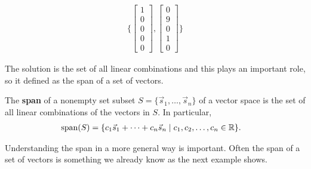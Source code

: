 \begin{align*} \{
\begin{bmatrix}
1 \\ 0 \\ 0 \\ 0 \\0
\end{bmatrix},
\begin{bmatrix}
0 \\ 9 \\ 0 \\ 1 \\ 0
\end{bmatrix}  \}
\end{align*}

The solution is the set of all linear combinations and this plays an important role, so it defined as the span of a set of vectors.



\begin{definition}
The \textbf{span} of a nonempty set subset $S=\{\vec{s}_1,\ldots, \vec{s}_n\}$ of a vector space is the set of all linear combinations of the vectors in $S$.   In particular,
%
\begin{align*}
\operatorname{span}(S) & = \{ c_1 \vec{s}_1  + \cdots + c_n \vec{s}_n\; | \; \text{$c_1, c_2, \ldots, c_n \in \mathbb{R}$} \}.
\end{align*}
\end{definition}

Understanding the span in a more general way is important.  Often the span of a set of vectors is something we already know as the next example shows.

